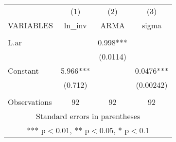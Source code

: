\documentclass[]{article}
\begin{document}
\begin{tabular}{lccc} \hline
 & (1) & (2) & (3) \\
VARIABLES & ln\_inv & ARMA & sigma \\ \hline
 &  &  &  \\
L.ar &  & 0.998*** &  \\
 &  & (0.0114) &  \\
Constant & 5.966*** &  & 0.0476*** \\
 & (0.712) &  & (0.00242) \\
 &  &  &  \\
 Observations & 92 & 92 & 92 \\ \hline
\multicolumn{4}{c}{ Standard errors in parentheses} \\
\multicolumn{4}{c}{ *** p$<$0.01, ** p$<$0.05, * p$<$0.1} \\
\end{tabular}
\end{document}
